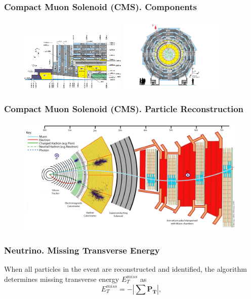 \begin{frame}\frametitle{Compact Muon Solenoid (CMS). Components}
\begin{figure}[htb]
  \begin{center}
    {\includegraphics[width=0.45\textwidth]{../figs/Exp/CMSview1.png}
     \includegraphics[width=0.45\textwidth]{../figs/Exp/CMSview.png}}
  \end{center}
\end{figure}
\end{frame}%


\begin{frame}\frametitle{Compact Muon Solenoid (CMS). Particle Reconstruction}
\begin{figure}[htb]
  \begin{center}
    {\includegraphics[width=0.98\textwidth]{../figs/Exp/CMS_Slice.png}}
  \end{center}
\end{figure}
\end{frame}%

 
\begin{frame}\frametitle{Neutrino. Missing Transverse Energy}
\scriptsize
When all particles in the event are reconstructed and identified, the algorithm determines missing transverse energy $E_T^{miss}$ as 
\begin{equation}\label{eq:MET}
  E_T^{miss} = - | \sum \mathbf{P_T} |,
\end{equation}
\end{frame}%
